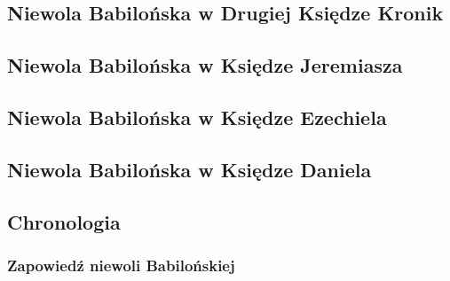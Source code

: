 \documentclass[10pt,a4paper,oneside]{article}
\begin{document}
\subsection{Niewola Babilońska w Drugiej Księdze Kronik}
\subsection{Niewola Babilońska w Księdze Jeremiasza}
\subsection{Niewola Babilońska w Księdze Ezechiela}
\subsection{Niewola Babilońska w Księdze Daniela}
\subsection{Chronologia}
\subsubsection{Zapowiedź niewoli Babilońskiej}
\end{document}
